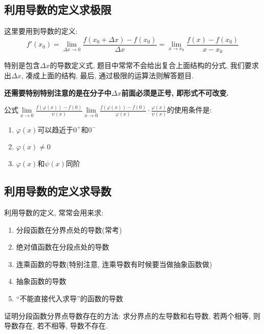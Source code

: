 \subsection{利用导数的定义求极限}
这里要用到导数的定义:
\begin{equation*}
    f'(x_{0})=\lim\limits_{\Delta x \rightarrow 0} \frac{f(x_{0}+\Delta x)-f(x_{0})}{\Delta x}=\lim\limits_{x \rightarrow x_{0}} \frac{f(x)-f(x_{0})}{x-x_{0}}
\end{equation*}\par
特别是包含$ \Delta x $的导数定义式, 题目中常常不会给出复合上面结构的分式, 我们要求出$ \Delta x $, 凑成上面的结构, 最后, 通过极限的运算法则解答题目.\par
\textbf{还需要特别特别注意的是在分子中$ \Delta x $前面必须是正号, 即形式不可改变.}
\begin{tcolorbox}
    公式$ \lim\limits_{x \rightarrow 0}\frac{f(\varphi(x))-f(0)}{\psi(x)}\lim\limits_{x \rightarrow 0}\frac{f(\varphi(x))-f(0)}{\varphi(x)}\cdot\frac{\varphi(x)}{\psi(x)} $的使用条件是:
    \begin{enumerate}
        \item $ \varphi(x) $可以趋近于$ 0^{+} $和$ 0^{-} $
        \item $ \varphi(x)\neq 0 $
        \item $ \varphi(x) $和$ \psi(x) $同阶
    \end{enumerate}
\end{tcolorbox}
\subsection{利用导数的定义求导数}
利用导数的定义, 常常会用来求:
\begin{enumerate}
    \item 分段函数在分界点处的导数(常考)
    \item 绝对值函数在分段点处的导数
    \item 连乘函数的导数(特别注意, 连乘导数有时候要当做抽象函数做)
    \item 抽象函数的导数
    \item ``不能直接代入求导''的函数的导数
\end{enumerate}\par
证明分段函数分界点导数存在的方法: 求分界点的左导数和右导数, 若两个相等, 则导数存在, 若不相等, 导数不存在.
